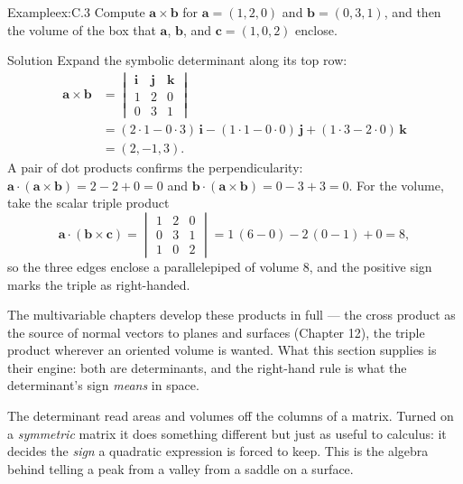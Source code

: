\documentclass[a4paper,12pt,oneside]{memoir}
\begin{document}
\begin{workedexample}
\begin{envexample}{Example}{ex:C.3}{}
Compute \(\mathbf{a} \times \mathbf{b}\) for \(\mathbf{a} = (1, 2, 0)\) and \(\mathbf{b} = (0, 3, 1)\), and then the volume of the box that \(\mathbf{a}\), \(\mathbf{b}\), and \(\mathbf{c} = (1, 0, 2)\) enclose.
\end{envexample}
\begin{envsolution}{Solution}{}{}
Expand the symbolic determinant along its top row: \[ \begin{aligned}
          \mathbf{a} \times \mathbf{b}
            &= \begin{vmatrix} \mathbf{i} & \mathbf{j} & \mathbf{k} \\ 1 & 2 & 0 \\ 0 & 3 & 1 \end{vmatrix} \\[2pt]
            &= (2\cdot 1 - 0\cdot 3)\,\mathbf{i} - (1\cdot 1 - 0\cdot 0)\,\mathbf{j} + (1\cdot 3 - 2\cdot 0)\,\mathbf{k} \\[2pt]
            &= (2, -1, 3).
        \end{aligned} \] A pair of dot products confirms the perpendicularity: \(\mathbf{a} \cdot (\mathbf{a} \times \mathbf{b}) = 2 - 2 + 0 = 0\) and \(\mathbf{b} \cdot (\mathbf{a} \times \mathbf{b}) = 0 - 3 + 3 = 0\). For the volume, take the scalar triple product \[ \mathbf{a} \cdot (\mathbf{b} \times \mathbf{c}) = \begin{vmatrix} 1 & 2 & 0 \\ 0 & 3 & 1 \\ 1 & 0 & 2 \end{vmatrix} = 1\,(6 - 0) - 2\,(0 - 1) + 0 = 8, \] so the three edges enclose a parallelepiped of volume \(8\), and the positive sign marks the triple as right-handed.
\end{envsolution}
\end{workedexample}
The multivariable chapters develop these products in full — the cross product as the source of normal vectors to planes and surfaces (Chapter 12), the triple product wherever an oriented volume is wanted. What this section supplies is their engine: both are determinants, and the right-hand rule is what the determinant’s sign \emph{means} in space.


The determinant read areas and volumes off the columns of a matrix. Turned on a \emph{symmetric} matrix it does something different but just as useful to calculus: it decides the \emph{sign} a quadratic expression is forced to keep. This is the algebra behind telling a peak from a valley from a saddle on a surface.
\end{document}
